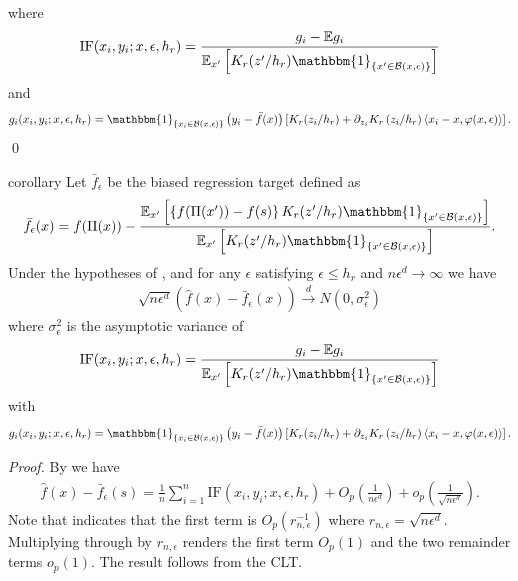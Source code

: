 \documentclass[11pt]{article}
\begin{document}
where 
\begin{equation}
    \text{IF}(x_i, y_i; x, \epsilon, h_r) = \frac{g_i - \mathbb{E}g_i}{\mathbb{E}_{x'}\left[K_r(z'/h_r)\mathbbm{1}_{\{x'\in \mathcal{B}(x, \epsilon)\}}\right]}
\end{equation}
and 
\begin{equation}
    g_i(x_i, y_i; x, \epsilon, h_r) = \mathbbm{1}_{\{x_i \in \mathcal{B}(x, \epsilon)\}}\left(y_i - \bar{f}(x)\right)\left[K_r(z_i/h_r) + \partial_{z_i}K_r\left(z_i/h_r\right)\left\langle x_i - x, \varphi(x,\epsilon)\right\rangle\right].
\end{equation}
\qed{}

\begin{restatable}{corollary}{} \label{corr: central limit for f}
    Let $\bar{f}_{\epsilon}$ be the biased regression target defined as
    \begin{equation}
        \bar{f}_{\epsilon}(x) = f(\Pi(x)) - \frac{\mathbb{E}_{x'}\left[\left\{f(\Pi(x')) - f(s)\right\}K_r(z'/h_r)\mathbbm{1}_{\{x'\in \mathcal{B}(x, \epsilon)\}}\right]}{\mathbb{E}_{x'}\left[K_r(z'/h_r)\mathbbm{1}_{\{x'\in \mathcal{B}(x, \epsilon)\}}\right]}.
    \end{equation}
    Under the hypotheses of , and for any $\epsilon$ satisfying $\epsilon \leq h_r$ and $n\epsilon^{d}\rightarrow \infty$ we have
    \begin{align}
        \sqrt{n\epsilon^d}(\hat{f}(x) - \bar{f}_{\epsilon}(x)) \overset{d}\rightarrow N(0, \sigma^2_{\epsilon})
    \end{align}
    where $\sigma_{\epsilon}^2$ is the asymptotic variance of 
    \begin{equation}
        \text{IF}(x_i, y_i; x, \epsilon, h_r) = \frac{g_i - \mathbb{E}g_i}{\mathbb{E}_{x'}\left[K_r(z'/h_r)\mathbbm{1}_{\{x'\in \mathcal{B}(x, \epsilon)\}}\right]}
    \end{equation}
    with 
    \begin{equation}
        g_i(x_i, y_i; x, \epsilon, h_r) = \mathbbm{1}_{\{x_i \in \mathcal{B}(x, \epsilon)\}}\left(y_i - \bar{f}(x)\right)\left[K_r(z_i/h_r) + \partial_{z_i}K_r\left(z_i/h_r\right)\left\langle x_i - x, \varphi(x,\epsilon)\right\rangle\right].
    \end{equation}
\end{restatable}
\noindent \textit{Proof.} By  we have
\begin{align}
    \hat{f}(x) - \bar{f}_{\epsilon}(s) =  \frac{1}{n}\sum_{i = 1}^n\text{IF}(x_i, y_i; x, \epsilon, h_r) + O_p\left(\frac{1}{n\epsilon^{d}}\right) + o_p\left(\frac{1}{\sqrt{n\epsilon^d}}\right).
\end{align}
Note that  indicates that the first term is $O_p(r_{n, \epsilon}^{-1})$ where $r_{n, \epsilon} = \sqrt{n\epsilon^d}$. Multiplying through by $r_{n, \epsilon}$ renders the first term $O_p(1)$ and the two remainder terms $o_p(1)$. The result follows from the CLT.
\end{document}
